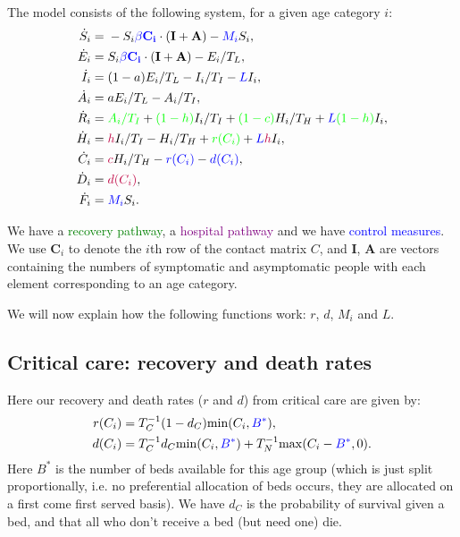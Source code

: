 The model consists of the following system, for a given age category $i$:
\begin{align}
    \Dot{S}_i ={}& - S_i \color{blue}\beta \mathbf{C_i} \color{black} \cdot (\mathbf{I}+\mathbf{A})
    -\color{blue} M_i \color{black} S_i,\\ 
    \Dot{E}_i ={}& S_i \color{blue}\beta \mathbf{C_i} \color{black} \cdot (\mathbf{I}+\mathbf{A}) 
    - E_i /T_L ,\\
    \Dot{I}_i ={}& (1-a) E_i /T_L
    - I_i /T_I
    -\color{blue} L \color{black} I_i ,\\ 
    \Dot{A}_i ={}&  a E_i /T_L
    - A_i /T_I,\\ 
    \Dot{R}_i ={}&  
    \color{green}A_i /T_I\color{black}
    + \color{green} (1-h) \color{black} I_i /T_I
    + \color{green} (1-c) \color{black} H_i /T_H
    + \color{blue} L \color{green} (1-h) \color{black} I_i
    ,\\
    \Dot{H}_i ={}&  \color{purple} h \color{black} I_i  /T_I
    - H_i /T_H
    + \color{green} r (C_i) \color{black}
    + \color{blue} L \color{black} \color{purple} h \color{black} I_i
    ,\\
    \Dot{C}_i ={}&  \color{purple} c \color{black} H_i /T_H
    - \color{blue} r (C_i) \color{black}
    - \color{blue} d (C_i) \color{black}
    ,\\
    \Dot{D}_i ={}&  \color{purple} d (C_i) \color{black}, \\
    \Dot{F}_i ={}&  \color{blue} M_i \color{black} S_i.
\end{align}

We have a \textcolor{green}{recovery pathway}, a \textcolor{purple}{hospital pathway} and we have \textcolor{blue}{control measures}. We use $\mathbf{C}_i$ to denote the $i$th row of the contact matrix $C$, and $\mathbf{I}$, $\mathbf{A}$ are vectors containing the numbers of symptomatic and asymptomatic people with each element corresponding to an age category.

We will now explain how the following functions work: $r$, $d$, $M_i$ and $L$.

\subsection{Critical care: recovery and death rates}
Here our recovery and death rates ($r$ and $d$) from critical care are given by:
\begin{align}
    r(C_i) ={}& T_C^{-1} (1-d_C) \mathrm{min}(C_i, \color{blue}B^*\color{black}),\\
    d(C_i) ={}& T_C^{-1} d_C \mathrm{min}(C_i, \color{blue}B^*\color{black}) + T_N^{-1} \mathrm{max}(C_i- \color{blue}B^*\color{black},0).
\end{align}
Here $B^*$ is the number of beds available for this age group (which is just split proportionally, i.e. no preferential allocation of beds occurs, they are allocated on a first come first served basis). We have $d_C$ is the probability of survival given a bed, and that all who don't receive a bed (but need one) die.

